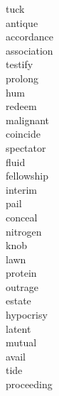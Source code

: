 \documentclass[a4paper, 11pt]{ctexart}
\begin{document}
\begin{multicols*}{3}
\begin{description}
\item[tuck]

\item[antique]

\item[accordance]

\item[association]

\item[testify]

\item[prolong]

\item[hum]

\item[redeem]

\item[malignant]

\item[coincide]

\item[spectator]

\item[fluid]

\item[fellowship]

\item[interim]

\item[pail]

\item[conceal]

\item[nitrogen]

\item[knob]

\item[lawn]

\item[protein]

\item[outrage]

\item[estate]

\item[hypocrisy]

\item[latent]

\item[mutual]

\item[avail]

\item[tide]

\item[proceeding]


\end{description}
\end{multicols*}
\end{document}
